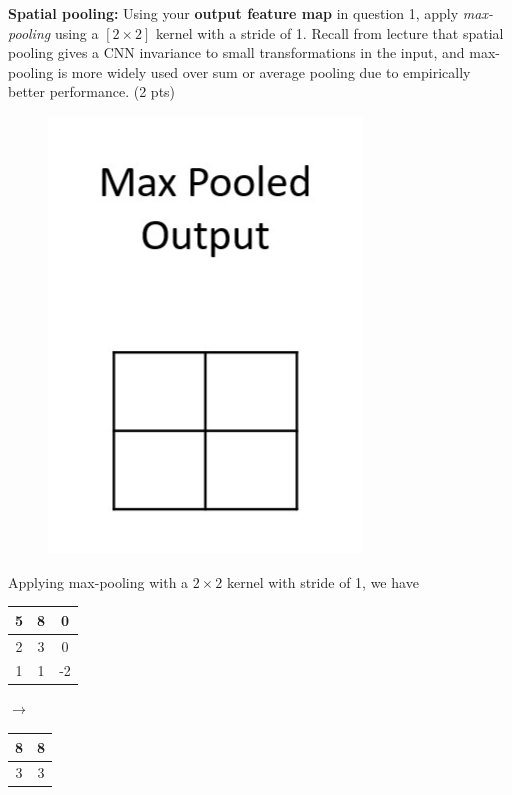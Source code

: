 \textbf{Spatial pooling:} Using your \textbf{output feature map} in question 1, apply \textit{max-pooling} using a $[2 \times 2]$ kernel with a stride of 1. Recall from lecture that spatial pooling gives a CNN invariance to small transformations in the input, and max-pooling is more widely used over sum or average pooling due to empirically better performance. (2 pts)

\begin{figure}[H]
	\centering
	\includegraphics[width=.11\linewidth]{images/max_pooled_blank.png}
\end{figure}

\begin{tcolorbox}[title=Solution]
	Applying max-pooling with a $2 \times 2$ kernel with stride of 1, we have
	\begin{center}
		\begin{tabular}{|c|c|c|}
			\hline
			5 & 8 & 0  \\ \hline
			2 & 3 & 0  \\ \hline
			1 & 1 & -2 \\ \hline
		\end{tabular}
		$\rightarrow$
		\begin{tabular}{|c|c|}
			\hline
			8 & 8 \\ \hline
			3 & 3 \\ \hline
		\end{tabular}

	\end{center}
\end{tcolorbox}
